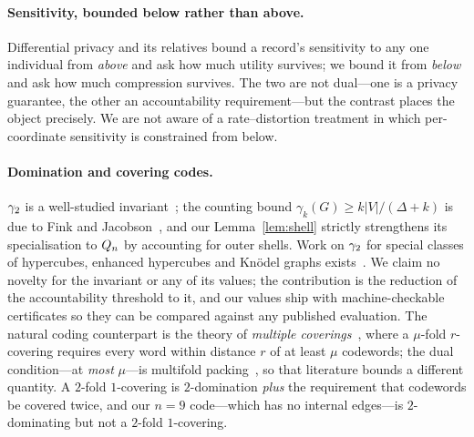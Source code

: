 \paragraph{Sensitivity, bounded below rather than above.}
Differential privacy and its relatives bound a record's sensitivity to any one
individual from \emph{above} and ask how much utility survives; we bound it from
\emph{below} and ask how much compression survives. The two are not dual---one is
a privacy guarantee, the other an accountability requirement---but the contrast
places the object precisely. We are not aware of a rate--distortion treatment in
which per-coordinate sensitivity is constrained from below.

\paragraph{Domination and covering codes.}
$\gamma_2$ is a well-studied invariant~\cite{chellalisurvey,bujtasjasko}; the
counting bound $\gamma_k(G) \ge k|V|/(\Delta+k)$ is due to Fink and
Jacobson~\cite{finkjacobson1985}, and our Lemma~\ref{lem:shell} strictly
strengthens its specialisation to $Q_n$ by accounting for outer shells. Work on
$\gamma_2$ for special classes of hypercubes, enhanced hypercubes and Kn\"odel
graphs exists~\cite{arulanand2023}. We claim no novelty for the invariant or any
of its values; the contribution is the reduction of the accountability threshold
to it, and our values ship with machine-checkable certificates so they can be
compared against any published evaluation. The natural coding counterpart is the
theory of \emph{multiple coverings}~\cite{coveringcodes}, where a $\mu$-fold
$r$-covering requires every word within distance $r$ of at least $\mu$ codewords;
the dual condition---at \emph{most} $\mu$---is multifold
packing~\cite{krotovpotapov}, so that literature bounds a different quantity. A
$2$-fold $1$-covering is $2$-domination \emph{plus} the requirement that
codewords be covered twice, and our $n=9$ code---which has no internal edges---is
$2$-dominating but not a $2$-fold $1$-covering.

